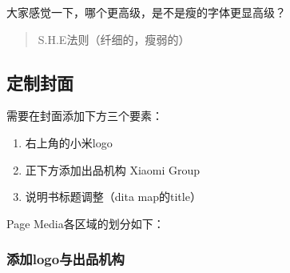 \documentclass[letterpaper,10pt,english]{sphinxmanual}
\begin{document}
\sphinxAtStartPar
大家感觉一下，哪个更高级，是不是瘦的字体更显高级？
\begin{quote}

\sphinxAtStartPar
S.H.E法则（纤细的，瘦弱的）
\end{quote}


\subsection{定制封面}
\label{\detokenize{formatting/css-pdf:id6}}
\sphinxAtStartPar
需要在封面添加下方三个要素：
\begin{enumerate}
%
\item {} 
\sphinxAtStartPar
右上角的小米logo

\item {} 
\sphinxAtStartPar
正下方添加出品机构  Xiaomi Group

\item {} 
\sphinxAtStartPar
说明书标题调整（dita map的title）

\end{enumerate}

\sphinxAtStartPar
Page Media各区域的划分如下：

\sphinxAtStartPar
{}


\subsubsection{添加logo与出品机构}
\label{\detokenize{formatting/css-pdf:logo}}
\begin{sphinxVerbatim}[commandchars=\\\{\}]





\end{sphinxVerbatim}
\end{document}
